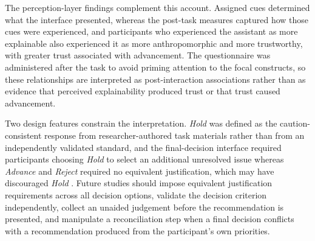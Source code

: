 The perception-layer findings complement this account. Assigned cues
determined what the interface presented, whereas the post-task measures
captured how those cues were experienced, and participants who experienced
the assistant as more explainable also experienced it as more
anthropomorphic and more trustworthy, with greater trust associated with
advancement. The questionnaire was administered after the task to avoid
priming attention to the focal constructs, so these relationships are
interpreted as post-interaction associations rather than as evidence that
perceived explainability produced trust or that trust caused advancement.

Two design features constrain the interpretation. \emph{Hold} was defined
as the caution-consistent response from researcher-authored task materials
rather than from an independently validated standard, and the
final-decision interface required participants choosing \emph{Hold} to
select an additional unresolved issue whereas \emph{Advance} and
\emph{Reject} required no equivalent justification, which may have
discouraged \emph{Hold} \cite{schemmer_appropriate_2023}. Future studies
should impose equivalent justification requirements across all decision
options, validate the decision criterion independently, collect an unaided
judgement before the recommendation is presented, and manipulate a
reconciliation step when a final decision conflicts with a recommendation
produced from the participant's own priorities.





